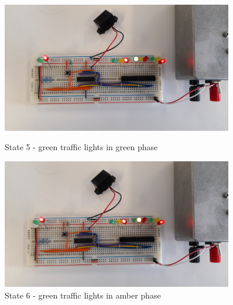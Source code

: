 \begin{figure}[H]
    \begin{minipage}{0.45\textwidth}
        \centering
        \includegraphics[width=0.9\textwidth]{images/final-testing/state_5.jpg}
        \caption{State 5 - green traffic lights in green phase}
        \label{fig:state_5}
    \end{minipage}\hfill
    \begin{minipage}{0.45\textwidth}
        \centering
        \includegraphics[width=0.9\textwidth]{images/final-testing/state_6.jpg}
        \caption{State 6 - green traffic lights in amber phase}
        \label{fig:state_6}
    \end{minipage}
\end{figure}
